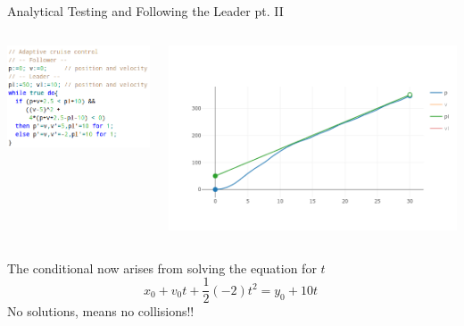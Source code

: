 \documentclass{beamer}
\begin{document}
\begin{frame}{Analytical Testing and Following the Leader pt. II}
  \begin{minipage}[1\textheight]{\textwidth}
  \begin{columns}[c]
  \begin{column}{0.45\textwidth}
          \hspace{0.4cm} 
          \includegraphics[scale=0.32]{./images/newcode.png}
  \end{column}
  \begin{column}{1\textwidth}
    \includegraphics[scale=0.3]{./images/newplot.png}
  \end{column}
  \end{columns}
  \end{minipage}

  \pause
  \vspace{0.5cm}
  The conditional now arises from \alert{solving} the equation for $t$
  \[
        x_0 + v_0t + \frac{1}{2}(-2)t^2 = y_0 + 10t\ 
  \]
  No solutions, means no collisions!!
\end{frame}
\end{document}
